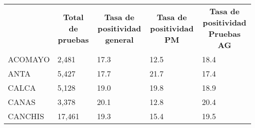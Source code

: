 \begin{tabular}{lllll}
	\rowcolor[HTML]{DDEBF7} 
	\multicolumn{1}{c}{\cellcolor[HTML]{DDEBF7}\textbf{PROVINCIA}} & \multicolumn{1}{c}{\cellcolor[HTML]{DDEBF7}\textbf{Total de pruebas}} & \multicolumn{1}{c}{\cellcolor[HTML]{DDEBF7}\textbf{Tasa de positividad general}} & \multicolumn{1}{c}{\cellcolor[HTML]{DDEBF7}\textbf{Tasa de positividad PM}} & \multicolumn{1}{c}{\cellcolor[HTML]{DDEBF7}\textbf{Tasa de positividad Pruebas AG}} \\
	\cellcolor[HTML]{FF5050}ACOMAYO                                & 2,481                                                                 & 17.3                                                                             & 12.5                                                                        & 18.4                                                                                \\
	\cellcolor[HTML]{FF5050}ANTA                                   & 5,427                                                                 & 17.7                                                                             & 21.7                                                                        & 17.4                                                                                \\
	\cellcolor[HTML]{FF5050}CALCA                                  & 5,128                                                                 & 19.0                                                                             & 19.8                                                                        & 18.9                                                                                \\
	\cellcolor[HTML]{FF5050}CANAS                                  & 3,378                                                                 & 20.1                                                                             & 12.8                                                                        & 20.4                                                                                \\
	\cellcolor[HTML]{FF5050}CANCHIS                                & 17,461                                                                & 19.3                                                                             & 15.4                                                                        & 19.5                                                                                \\

\end{tabular}
